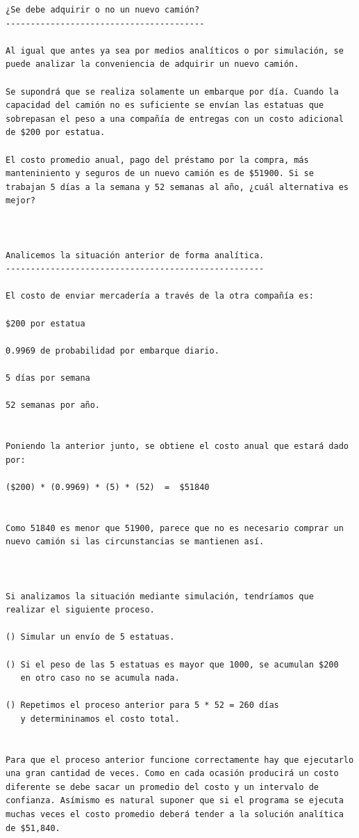 \begin{verbatim}
¿Se debe adquirir o no un nuevo camión?
----------------------------------------

Al igual que antes ya sea por medios analíticos o por simulación, se puede analizar la conveniencia de adquirir un nuevo camión.

Se supondrá que se realiza solamente un embarque por día. Cuando la capacidad del camión no es suficiente se envían las estatuas que sobrepasan el peso a una compañía de entregas con un costo adicional de $200 por estatua. 

El costo promedio anual, pago del préstamo por la compra, más manteniniento y seguros de un nuevo camión es de $51900. Si se trabajan 5 días a la semana y 52 semanas al año, ¿cuál alternativa es mejor?



Analicemos la situación anterior de forma analítica.
----------------------------------------------------

El costo de enviar mercadería a través de la otra compañía es:

$200 por estatua

0.9969 de probabilidad por embarque diario.

5 días por semana

52 semanas por año.


Poniendo la anterior junto, se obtiene el costo anual que estará dado por:

($200) * (0.9969) * (5) * (52)  =  $51840


Como 51840 es menor que 51900, parece que no es necesario comprar un nuevo camión si las circunstancias se mantienen así.



Si analizamos la situación mediante simulación, tendríamos que realizar el siguiente proceso.

() Simular un envío de 5 estatuas.

() Si el peso de las 5 estatuas es mayor que 1000, se acumulan $200
   en otro caso no se acumula nada.

() Repetimos el proceso anterior para 5 * 52 = 260 días 
   y determininamos el costo total.


Para que el proceso anterior funcione correctamente hay que ejecutarlo una gran cantidad de veces. Como en cada ocasión producirá un costo diferente se debe sacar un promedio del costo y un intervalo de confianza. Asímismo es natural suponer que si el programa se ejecuta muchas veces el costo promedio deberá tender a la solución analítica de $51,840.





\end{verbatim}
